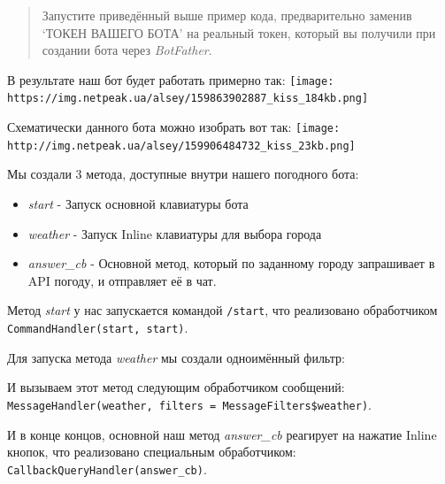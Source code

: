 \documentclass[
]{book}
\newenvironment{Shaded}{\begin{snugshade}}{\end{snugshade}}
\newcommand{\CommentTok}[1]{\textcolor[rgb]{0.56,0.35,0.01}{\textit{#1}}}
\newcommand{\ControlFlowTok}[1]{\textcolor[rgb]{0.13,0.29,0.53}{\textbf{#1}}}
\newcommand{\DocumentationTok}[1]{\textcolor[rgb]{0.56,0.35,0.01}{\textbf{\textit{#1}}}}
\newcommand{\FunctionTok}[1]{\textcolor[rgb]{0.13,0.29,0.53}{\textbf{#1}}}
\newcommand{\NormalTok}[1]{#1}
\newcommand{\OtherTok}[1]{\textcolor[rgb]{0.56,0.35,0.01}{#1}}
\newcommand{\SpecialCharTok}[1]{\textcolor[rgb]{0.81,0.36,0.00}{\textbf{#1}}}
\newcommand{\StringTok}[1]{\textcolor[rgb]{0.31,0.60,0.02}{#1}}
\providecommand{\tightlist}{%
  \setlength{\itemsep}{0pt}\setlength{\parskip}{0pt}}
\begin{document}
\begin{quote}
Запустите приведённый выше пример кода, предварительно заменив `ТОКЕН ВАШЕГО БОТА' на реальный токен, который вы получили при создании бота через \emph{BotFather}.
\end{quote}

В результате наш бот будет работать примерно так:
\texttt{[image: https://img.netpeak.ua/alsey/159863902887\_kiss\_184kb.png]}

Схематически данного бота можно изобрать вот так:
\texttt{[image: http://img.netpeak.ua/alsey/159906484732\_kiss\_23kb.png]}

Мы создали 3 метода, доступные внутри нашего погодного бота:

\begin{itemize}
\tightlist
\item
  \emph{start} - Запуск основной клавиатуры бота
\item
  \emph{weather} - Запуск Inline клавиатуры для выбора города
\item
  \emph{answer\_cb} - Основной метод, который по заданному городу запрашивает в API погоду, и отправляет её в чат.
\end{itemize}

Метод \emph{start} у нас запускается командой \texttt{/start}, что реализовано обработчиком \texttt{CommandHandler(\textquotesingle{}start\textquotesingle{},\ start)}.

Для запуска метода \emph{weather} мы создали одноимённый фильтр:

\begin{Shaded}
\end{Shaded}

И вызываем этот метод следующим обработчиком сообщений: \texttt{MessageHandler(weather,\ filters\ =\ MessageFilters\$weather)}.

И в конце концов, основной наш метод \emph{answer\_cb} реагирует на нажатие Inline кнопок, что реализовано специальным обработчиком: \texttt{CallbackQueryHandler(answer\_cb)}.
\end{document}
